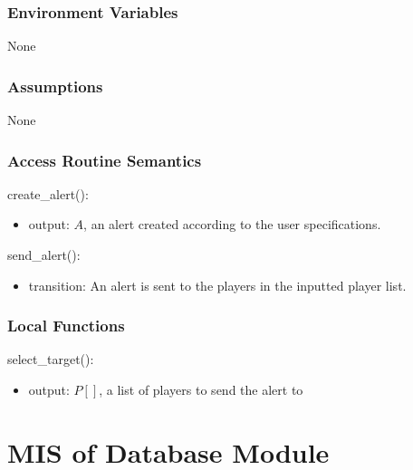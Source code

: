 \documentclass[12pt, titlepage]{article}
\begin{document}
\subsubsection{Environment Variables}

None

\subsubsection{Assumptions}


None

\subsubsection{Access Routine Semantics}

\noindent create\_alert():
\begin{itemize}
\item output: $A$, an alert created according to the user specifications.
\end{itemize}

\noindent send\_alert():
\begin{itemize}
\item transition: An alert is sent to the players in the inputted player list.
\end{itemize}

\subsubsection{Local Functions}

\noindent select\_target():
\begin{itemize}
\item output: $P[]$, a list of players to send the alert to
\end{itemize}

\newpage

\section{MIS of Database Module} \label{mDB}


\end{document}
